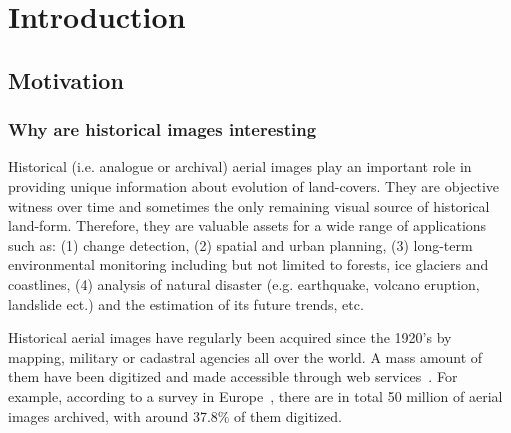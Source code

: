 
\chapter{Introduction}
\label{chap:intro}
\minitoc

\section{Motivation}
\subsection{Why are historical images interesting}
Historical (i.e. analogue or archival) aerial images play an important role in providing unique information about evolution of land-covers. 
They are objective witness over time and sometimes the only remaining visual source of historical land-form. Therefore, they are valuable assets for a wide range of applications such as: (1) change detection, (2) spatial and urban planning, (3) long-term environmental monitoring including but not limited to forests, ice glaciers and coastlines, (4) analysis of natural disaster (e.g. earthquake, volcano eruption, landslide ect.) and the estimation of its future trends, etc.
\par
Historical aerial images have regularly been acquired since the 1920’s by mapping, military or cadastral agencies all over the world. A mass amount of them have been digitized and made accessible through web services~\cite{sebastien2019archiving,earthexplorer,remonterletemps}. 
For example, according to a survey in Europe~\cite{sebastien2019archiving}, there are in total 50 million of aerial images archived, with around 37.8\% of them digitized.
